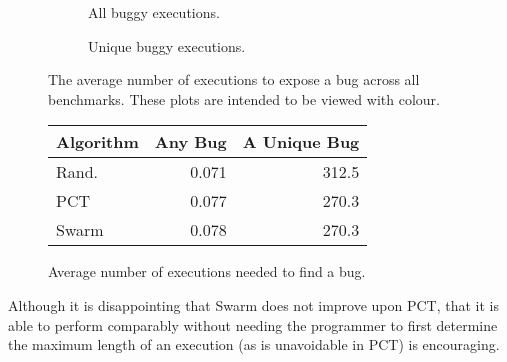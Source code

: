 \begin{figure}[t]
  \centering
  \begin{subfigure}{0.49\textwidth}
    \centering
    \resizebox{\textwidth}{!}{}
    \caption{All buggy executions.}\label{fig:freqbugs-total}
  \end{subfigure}
  \begin{subfigure}{0.49\textwidth}
    \centering
    \resizebox{\textwidth}{!}{}
    \caption{Unique buggy executions.}\label{fig:freqbugs-unique}
  \end{subfigure}
  \caption{The average number of executions to expose a bug across all benchmarks.  These plots are intended to be viewed with colour.}\label{fig:freqbugs}
\end{figure}

\begin{figure}[t]
  \centering
  \begin{tabular}{lrr} \toprule
    Algorithm & Any Bug & A Unique Bug \\ \midrule
    Rand. & 0.071 & 312.5 \\
    PCT   & 0.077 & 270.3 \\
    Swarm & 0.078 & 270.3 \\ \bottomrule
  \end{tabular}
  \caption{Average number of executions needed to find a bug.}\label{tbl:freqs}
\end{figure}

Although it is disappointing that Swarm does not improve upon PCT, that it is
able to perform comparably without needing the programmer to first determine the
maximum length of an execution (as is unavoidable in PCT) is encouraging.
